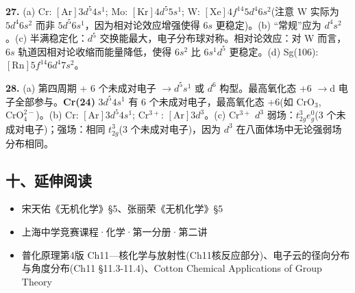 \documentclass[a4paper,11pt]{ctexart}
\providecommand{\tightlist}{\setlength{\itemsep}{0pt}\setlength{\parskip}{0pt}}
\newcommand{\箭}{\ensuremath{\rightarrow}}
\newcommand{\左箭}{\ensuremath{\leftarrow}}
\newcommand{\上箭}{\ensuremath{\uparrow}}
\newcommand{\下箭}{\ensuremath{\downarrow}}
\newcommand{\衡}{\ensuremath{\rightleftharpoons}}
\newcommand{\双箭}{\ensuremath{\leftrightarrow}}
\newcommand{\约等于}{\ensuremath{\approx}}
\newcommand{\小于等于}{\ensuremath{\leq}}
\newcommand{\大于等于}{\ensuremath{\geq}}
\newcommand{\不等于}{\ensuremath{\neq}}
\newcommand{\西格马}{\ensuremath{\sigma}}
\newcommand{\派}{\ensuremath{\pi}}
\begin{document}
\textbf{27.} (a) Cr: \([\mathrm{Ar}]3d^5 4s^1\); Mo: \([\mathrm{Kr}]4d^5 5s^1\); W: \([\mathrm{Xe}]4f^{14} 5d^4 6s^2\)(注意 W 实际为 \(5d^4 6s^2\) 而非 \(5d^5 6s^1\)，因为相对论效应增强使得 \(6s\) 更稳定)。(b) ``常规''应为 \(d^4 s^2\)。(c) 半满稳定化：\(d^5\) 交换能最大，电子分布球对称。相对论效应：对 W 而言，\(6s\) 轨道因相对论收缩而能量降低，使得 \(6s^2\) 比 \(6s^1 d^5\) 更稳定。(d) Sg(106): \([\mathrm{Rn}]5f^{14} 6d^4 7s^2\)。

\textbf{28.} (a) 第四周期 + 6 个未成对电子 \箭 \(d^5 s^1\) 或 \(d^6\) 构型。最高氧化态 +6 \箭 d 电子全部参与。\textbf{Cr(24)} \(3d^5 4s^1\) 有 6 个未成对电子，最高氧化态 +6(如 \(\mathrm{CrO_3}\), \(\mathrm{CrO_4^{2-}}\))。(b) Cr: \([\mathrm{Ar}]3d^5 4s^1\); \(\mathrm{Cr^{3+}}\): \([\mathrm{Ar}]3d^3\)。(c) \(\mathrm{Cr^{3+}}\) \(d^3\) 弱场：\(t_{2g}^3 e_g^0\)(3 个未成对电子)；强场：相同 \(t_{2g}^3\)(3 个未成对电子)，因为 \(d^3\) 在八面体场中无论强弱场分布相同。

\subsection{十、延伸阅读}\label{ux5341ux5ef6ux4f38ux9605ux8bfb}

\begin{itemize}
\tightlist
\item
  宋天佑《无机化学》§5、张丽荣《无机化学》§5
\item
  上海中学竞赛课程·化学·第一分册·第二讲
\item
  普化原理第4版 Ch11---核化学与放射性(Ch11核反应部分)、电子云的径向分布与角度分布(Ch11 §11.3-11.4)、Cotton Chemical Applications of Group Theory
\end{itemize}
\end{document}
